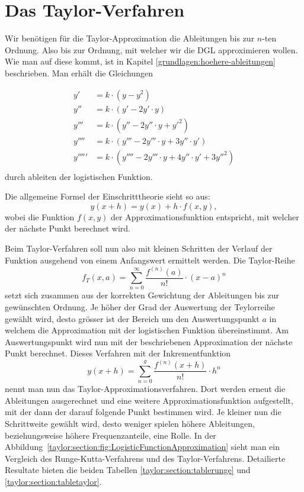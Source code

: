 \section{Das Taylor-Verfahren}
\label{taylor:subsection:Vorgehen}
Wir benötigen für die Taylor-Approximation die Ableitungen bis zur $n$-ten Ordnung.
Also bis zur Ordnung, mit welcher wir die DGL approximieren wollen.
Wie man auf diese kommt, ist in Kapitel \ref{grundlagen:hoehere-ableitungen} beschrieben.
Man erhält die Gleichungen

\begin{equation}
\begin{aligned}
y'&=k\cdot (y-y^{2})\\
y''&=k\cdot (y'-2y'\cdot y)\\
y'''&=k\cdot (y''-2y''\cdot y+y'^{2})\\
y''''&=k\cdot (y'''-2y'''\cdot y+3y''\cdot y')\\
y'''''&=k\cdot (y''''-2y'''\cdot y+4y''\cdot y'+3y''^{2})\\
\end{aligned}
\end{equation}
durch ableiten der logistischen Funktion.

Die allgemeine Formel der Einschritttheorie sieht so aus:
\begin{equation}
y(x+h) = y(x) + h\cdot f(x,y),
\end{equation}
wobei die Funktion $f(x,y)$ der Approximationsfunktion entspricht, mit welcher der nächste Punkt berechnet wird.

Beim Taylor-Verfahren soll nun also mit kleinen Schritten der Verlauf der Funktion ausgehend von einem Anfangswert ermittelt werden.
Die Taylor-Reihe
\begin{equation}
f_{T}(x,a)
=
\sum_{n=0}^{\infty}{\frac{f^{(n)}(a)}{n!}}\cdot (x-a)^{n}
\label{taylor:section:taylor}
\end{equation}
setzt sich zusammen aus der korrekten Gewichtung der Ableitungen bis zur gewünschten Ordnung.
Je höher der Grad der Auswertung der Teylorreihe gewählt wird, desto grösser ist der Bereich um den Auswertungspunkt $a$ in welchem die Approximation mit der logistischen Funktion übereinstimmt.
Am Auswertungspunkt wird nun mit der beschriebenen Approximation der nächste Punkt berechnet.
Dieses Verfahren mit der Inkrementfunktion
%
%
\begin{equation}
y(x+h)
=
\sum_{n=0}^{g}{\frac{f^{(n)}(x+h)}{n!}}\cdot h^{n}
\label{taylor:section:taylorapproximation}
\end{equation}
nennt man nun das Taylor-Approximationsverfahren.
Dort werden erneut die Ableitungen ausgerechnet und eine weitere Approximationsfunktion aufgestellt, mit der dann der darauf folgende Punkt bestimmen wird.
Je kleiner nun die Schrittweite gewählt wird, desto weniger spielen höhere Ableitungen, beziehungsweise höhere Frequenzanteile, eine Rolle.
In der Abbildung~\ref{taylor:section:fig:LogisticFunctionApproximation} sieht man ein Vergleich des Runge-Kutta-Verfahrens und des Taylor-Verfahrens.
Detailierte Resultate bieten die beiden Tabellen \ref{taylor:section:tablerunge} und \ref{taylor:section:tabletaylor}.

